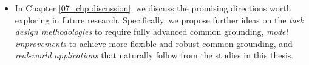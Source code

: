 \begin{itemize}
  \item In Chapter \ref{07_chp:discussion}, we discuss the promising directions worth exploring in future research. Specifically, we propose further ideas on the \textit{task design methodologies} to require fully advanced common grounding, \textit{model improvements} to achieve more flexible and robust common grounding, and \textit{real-world applications} that naturally follow from the studies in this thesis.
\end{itemize}

